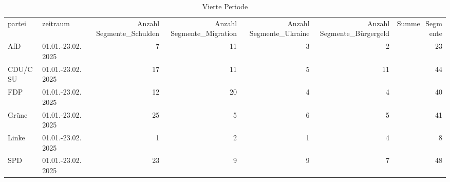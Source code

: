 \begin{table}
\caption{Vierte Periode}
\label{tab:meine_tabelle}
\begin{tabular}{llrrrrr}
partei & zeitraum & Anzahl Segmente_Schulden & Anzahl Segmente_Migration & Anzahl Segmente_Ukraine & Anzahl Segmente_Bürgergeld & Summe_Segmente \\
AfD & 01.01.-23.02.2025 & 7 & 11 & 3 & 2 & 23 \\
CDU/CSU & 01.01.-23.02.2025 & 17 & 11 & 5 & 11 & 44 \\
FDP & 01.01.-23.02.2025 & 12 & 20 & 4 & 4 & 40 \\
Grüne & 01.01.-23.02.2025 & 25 & 5 & 6 & 5 & 41 \\
Linke & 01.01.-23.02.2025 & 1 & 2 & 1 & 4 & 8 \\
SPD & 01.01.-23.02.2025 & 23 & 9 & 9 & 7 & 48 \\
\end{tabular}
\end{table}
